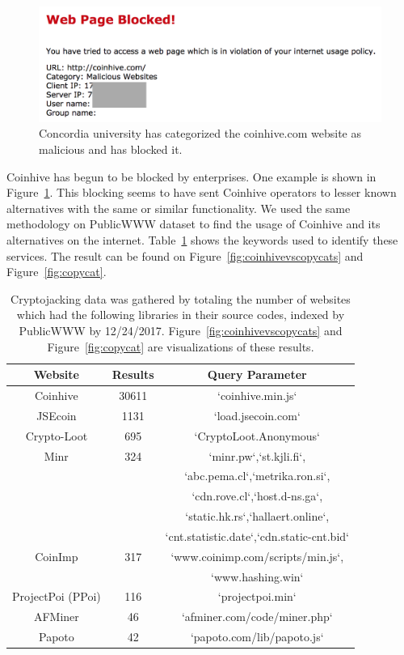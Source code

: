 \begin{figure}[t]
\centering
\includegraphics[width=0.9\linewidth]{figures/coinhive_blocked.png}
\caption[Concordia University Blocking Coinhive Website]{Concordia university has categorized the coinhive.com website as malicious and has blocked it.\label{fig:concordia}}
\end{figure}

Coinhive has begun to be blocked by enterprises. One example is shown in Figure~\ref{fig:concordia}. This blocking seems to have sent Coinhive operators to lesser known alternatives with the same or similar functionality. We used the same methodology on PublicWWW dataset to find the usage of Coinhive and its alternatives on the internet. Table~\ref{tab:findcoinhive} shows the keywords used to identify these services. The result can be found on Figure~\ref{fig:coinhivevscopycats} and Figure~\ref{fig:copycat}.

\begin{table}[t]
\centering
\begin{tabular}{|cc|c|}
\hline
\textbf{Website} & \textbf{Results} & \textbf{Query Parameter}  \\ \hline
Coinhive & 30611 & `coinhive.min.js`   \\  \hline
JSEcoin & 1131 & `load.jsecoin.com`   \\  \hline
Crypto-Loot & 695 & `CryptoLoot.Anonymous`  \\  \hline
Minr & 324 & `minr.pw`,`st.kjli.fi`, \\
~  & ~ &  `abc.pema.cl`,`metrika.ron.si`, \\  
~  & ~ &  `cdn.rove.cl`,`host.d-ns.ga`, \\  
~  & ~ &  `static.hk.rs`,`hallaert.online`, \\  
~  & ~ &  `cnt.statistic.date`,`cdn.static-cnt.bid` \\     \hline
CoinImp & 317 &`www.coinimp.com/scripts/min.js`,  \\ 
~  & ~ &  `www.hashing.win` \\     \hline
ProjectPoi (PPoi) & 116 & `projectpoi.min`  \\  \hline
AFMiner & 46 & `afminer.com/code/miner.php`	  \\  \hline
Papoto & 42 & `papoto.com/lib/papoto.js`  \\ \hline
\end{tabular}
\bigskip
\caption[Cryptojacking Identifying Data]{Cryptojacking data was gathered by totaling the number of websites which had the following libraries in their source codes, indexed by PublicWWW by 12/24/2017. Figure~\ref{fig:coinhivevscopycats} and Figure~\ref{fig:copycat} are visualizations of these results.\label{tab:findcoinhive}}
\end{table}



